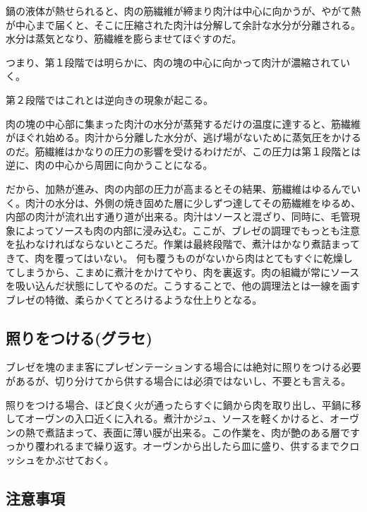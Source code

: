 鍋の液体が熱せられると、肉の筋繊維が締まり肉汁は中心に向かうが、やがて熱が中心まで届くと、そこに圧縮された肉汁は分解して余計な水分が分離される。水分は蒸気となり、筋繊維を膨らませてほぐすのだ。

つまり、第１段階では明らかに、肉の塊の中心に向かって肉汁が濃縮されていく。

第２段階ではこれとは逆向きの現象が起こる。

肉の塊の中心部に集まった肉汁の水分が蒸発するだけの温度に達すると、筋繊維がほぐれ始める。肉汁から分離した水分が、逃げ場がないために蒸気圧をかけるのだ。筋繊維はかなりの圧力の影響を受けるわけだが、この圧力は第１段階とは逆に、肉の中心から周囲に向かうことになる。

だから、加熱が進み、肉の内部の圧力が高まるとその結果、筋繊維はゆるんでいく。肉汁の水分は、外側の焼き固めた層に少しずつ達してその筋繊維をゆるめ、内部の肉汁が流れ出す通り道が出来る。肉汁はソースと混ざり、同時に、毛管現象によってソースも肉の内部に浸み込む。ここが、ブレゼの調理でもっとも注意を払わなければならないところだ。作業は最終段階で、煮汁はかなり煮詰まってきて、肉を覆ってはいない。
何も覆うものがないから肉はとてもすぐに乾燥してしまうから、こまめに煮汁をかけてやり、肉を裏返す。肉の組織が常にソースを吸い込んだ状態にしてやるのだ。こうすることで、他の調理法とは一線を画すブレゼの特徴、柔らかくてとろけるような仕上りとなる。

\hypertarget{ux7167ux308aux3092ux3064ux3051ux308bux30b0ux30e9ux30bb}{%
\subsection{照りをつける(グラセ)}\label{ux7167ux308aux3092ux3064ux3051ux308bux30b0ux30e9ux30bb}}

ブレゼを塊のまま客にプレゼンテーションする場合には絶対に照りをつける必要があるが、切り分けてから供する場合には必須ではないし、不要とも言える。

照りをつける場合、ほど良く火が通ったらすぐに鍋から肉を取り出し、平鍋に移してオーヴンの入口近くに入れる。煮汁かジュ、ソースを軽くかけると、オーヴンの熱で煮詰まって、表面に薄い膜が出来る。この作業を、肉が艶のある層ですっかり覆われるまで繰り返す。オーヴンから出したら皿に盛り、供するまでクロッシュをかぶせておく。

\hypertarget{ux6ce8ux610fux4e8bux9805}{%
\subsection{注意事項}\label{ux6ce8ux610fux4e8bux9805}}

